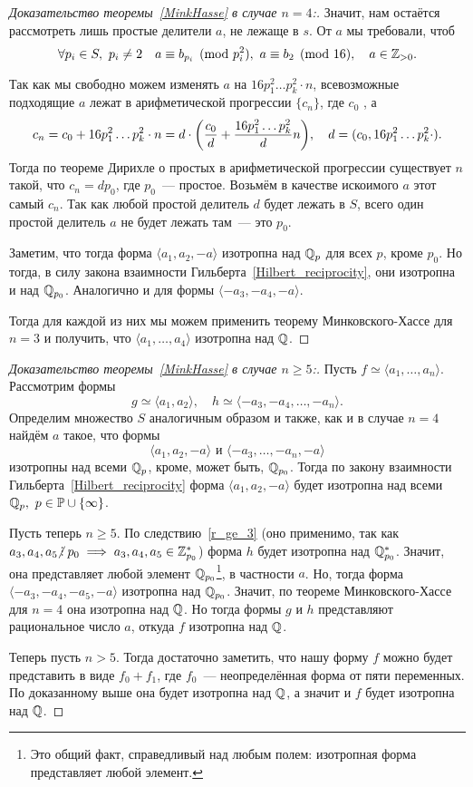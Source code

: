 \begin{proof}[Доказательство теоремы~\ref{MinkHasse} в случае $n = 4$:]
		Значит, нам остаётся рассмотреть лишь простые делители $a$, не лежаще в $s$. От $a$ мы требовали, чтоб 
		\[
			\forall p_i \in S, \ p_i \neq 2  \quad a \equiv b_{p_i} \pmod{p_i^2}, \ a \equiv b_{2} \pmod{16}, \quad a \in \mathbb{Z}_{> 0}.
		\]

		Так как мы свободно можем изменять $a$ на $16p_1^2\ldots p_k^2 \cdot n$, всевозможные подходящие $a$ лежат в арифметической прогрессии $\{ c_n \}$, где $c_0$ , а 
		\[
			c_n = c_0 + 16p_1^2\ldots p_k^2 \cdot n = d \cdot\lr*{\frac{c_0}{d} + \frac{16p_1^2\ldots p_k^2}{d}n}, \quad d = (c_0, 16p_1^2\ldots p_k^2 \cdot).
		\]
		Тогда по теореме Дирихле о простых в арифметической прогрессии существует $n$ такой, что  $c_n = d p_0$, где $p_0$~--- простое. Возьмём в качестве искоимого $a$ этот самый $c_n$. Так как любой простой делитель $d$ будет лежать в $S$, всего один простой делитель $a$ не будет лежать там~--- это $p_0$. 

		Заметим, что тогда форма $\langle a_1, a_2, -a \rangle$ изотропна над $\mathbb{Q}_{p}$ для всех $p$, кроме $p_0$. Но тогда, в силу закона взаимности Гильберта~\ref{Hilbert_reciprocity}, они изотропна и над $\mathbb{Q}_{p_0}$. Аналогично и для формы $\langle -a_3, -a_4, -a \rangle$. 

		Тогда для каждой из них мы можем применить теорему Минковского-Хассе для $n = 3$ и получить, что $\langle a_1, \ldots, a_4 \rangle$ изотропна над $\mathbb{Q}$.
	\end{proof}

	\begin{proof}[Доказательство теоремы~\ref{MinkHasse} в случае $n \ge 5$:]

	Пусть $f \simeq \langle a_1, \ldots, a_n \rangle$. Рассмотрим формы 
	\[
		g \simeq \langle a_1, a_2 \rangle, \quad h \simeq \langle -a_3, -a_4, \ldots, -a_n \rangle.
	\]
	Определим множество $S$ аналогичным образом и также, как и в случае $n = 4$ найдём $a$ такое, что формы 
	\[
		\langle a_1, a_2, - a \rangle \text{ и } \langle -a_3, \ldots, -a_n, -a \rangle
	\]
	изотропны над всеми $\mathbb{Q}_{p}$, кроме, может быть, $\mathbb{Q}_{p_0}$. Тогда по закону взаимности Гильберта~\ref{Hilbert_reciprocity} форма $\langle a_1, a_2, - a \rangle$ будет изотропна над всеми $\mathbb{Q}_{p}, \ p \in \mathbb{P} \cup \{\infty\}$. 

	Пусть теперь $n \ge 5$. По следствию~\ref{r_ge_3} (оно применимо, так как $a_3, a_4, a_5 \notdivby p_0 \implies a_3, a_4, a_5 \in \Z_{p_0}^{*}$)  форма $h$ будет изотропна над $\mathbb{Q}_{p_0}^{*}$. Значит, она представляет любой элемент $\mathbb{Q}_{p_0}$\footnote{Это общий факт, справедливый над любым полем: изотропная форма представляет любой элемент.}, в частности $a$.  Но, тогда форма $\langle -a_3, -a_4, -a_5, -a \rangle$ изотропна над $\mathbb{Q}_{p_0}$. Значит, по теореме Минковского-Хассе для $n = 4$ она изотропна над $\mathbb{Q}$. Но тогда формы $g$ и $h$ представляют рациональное число $a$, откуда $f$ изотропна над $\mathbb{Q}$.
	
	Теперь пусть $n > 5$.  Тогда достаточно заметить, что нашу форму  $f$ можно будет представить в  виде $f_0 + f_1$, где $f_0$~--- неопределённая форма от пяти переменных. По доказанному выше она будет изотропна над $\mathbb{Q}$, а значит и $f$ будет изотропна над $\mathbb{Q}$. 
	\end{proof}

